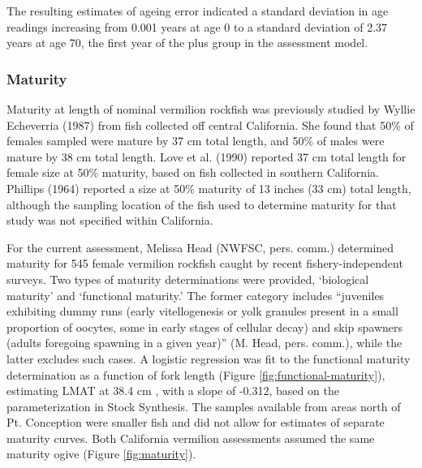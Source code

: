 \documentclass[11pt,
  english,
  a4paper,
]{article}
\begin{document}
The resulting estimates of ageing error indicated a standard deviation in age readings increasing from 0.001 years at age 0 to a standard deviation of 2.37 years at age 70, the first year of the plus group in the assessment model.


\hypertarget{maturity}{%
\subsubsection{Maturity}\label{maturity}}

\leavevmode\tagmcend\tagstructend

Maturity at length of nominal vermilion rockfish was previously studied by Wyllie Echeverria {(1987)\leavevmode\tagmcend\tagstructend} from fish collected off central California. She found that 50\% of females sampled were mature by 37 cm total length, and 50\% of males were mature by 38 cm total length. Love et al. {(1990)\leavevmode\tagmcend\tagstructend} reported 37 cm total length for female size at 50\% maturity, based on fish collected in southern California. Phillips {(1964)\leavevmode\tagmcend\tagstructend} reported a size at 50\% maturity of 13 inches (33 cm) total length, although the sampling location of the fish used to determine maturity for that study was not specified within California.

For the current assessment, Melissa Head (NWFSC, pers. comm.) determined maturity for 545 female vermilion rockfish caught by recent fishery-independent surveys. Two types of maturity determinations were provided, `biological maturity' and `functional maturity.' The former category includes ``juveniles exhibiting dummy runs (early vitellogenesis or yolk granules present in a small proportion of oocytes, some in early stages of cellular decay) and skip spawners (adults foregoing spawning in a given year)'' (M. Head, pers. comm.), while the latter excludes such cases. A logistic regression was fit to the functional maturity determination as a function of fork length (Figure \ref{fig:functional-maturity}), estimating LMAT at 38.4 cm , with a slope of -0.312, based on the parameterization in Stock Synthesis. The samples available from areas north of Pt. Conception were smaller fish and did not allow for estimates of separate maturity curves. Both California vermilion assessments assumed the same maturity ogive (Figure \ref{fig:maturity}).
\end{document}

